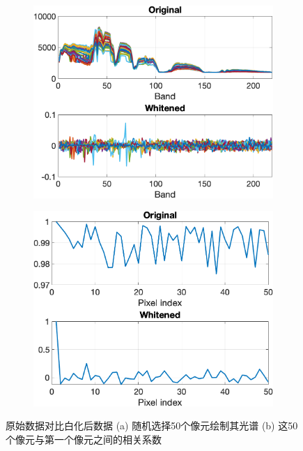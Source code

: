 \begin{figure}[htb!]
    \centering
    \begin{subfigure}{.45\textwidth}
        \includegraphics[width=\textwidth]{./img/sam_spectral}
        \caption{}
        \label{fig:sam_compare_1}
    \end{subfigure}
    \begin{subfigure}{.45\textwidth}
        \includegraphics[width=\textwidth]{./img/sam_pixel}
        \caption{}
        \label{fig:sam_compare_2}
    \end{subfigure}
    \caption{原始数据对比白化后数据 (a) 随机选择50个像元绘制其光谱 (b) 这50个像元与第一个像元之间的相关系数}
    \label{fig:sam_compare}
\end{figure}

